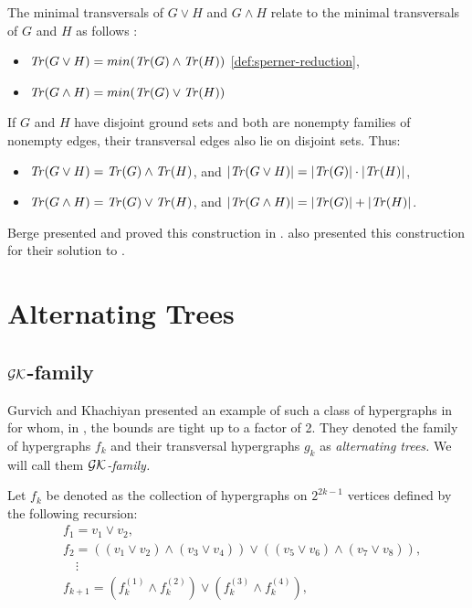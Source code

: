 The minimal transversals of $G\vee H$ and $G\wedge H$ relate to the minimal transversals of $G$ and $H$ as follows \cite{Ber87}:
\begin{itemize}
\item $\mathit{Tr}(G\vee H)=min(\mathit{Tr}(G)\wedge\mathit{Tr}(H))$ \ref{def:sperner-reduction},
\item $\mathit{Tr}(G\wedge H)=min(\mathit{Tr}(G)\vee\mathit{Tr}(H))$
\end{itemize}
If $G$ and $H$ have disjoint ground sets and both are nonempty families of nonempty edges, their transversal edges also lie on disjoint sets. Thus:
\begin{itemize}
\item $\mathit{Tr}(G\vee H)=\mathit{Tr}(G)\wedge\mathit{Tr}(H)$, and $|\mathit{Tr}(G\vee H)|=|\mathit{Tr}(G)|\cdot|\mathit{Tr}(H)|$,
\item $\mathit{Tr}(G\wedge H)=\mathit{Tr}(G)\vee\mathit{Tr}(H)$, and $|\mathit{Tr}(G\wedge H)|=|\mathit{Tr}(G)|+|\mathit{Tr}(H)|$.
\end{itemize}
\cite{Tak08}

Berge presented and proved this construction in \cite{Ber87}. \cite{KS03} also presented this construction for their solution to \FKA.

\section{Alternating Trees}\label{sec:alternating}

\subsection{\texorpdfstring{$\mathcal{GK}$}{GK}-family}

Gurvich and Khachiyan presented an example of such a class of hypergraphs in   for whom, in \FKA, the bounds are tight up to a factor of 2. They denoted the family of hypergraphs $f_k$ and their transversal hypergraphs $g_k$ as \emph{alternating trees.} We will call them \emph{$\mathcal{GK}$-family.}

Let $f_k$ be denoted as the collection of hypergraphs on $2^{2k-1}$ vertices defined by the following recursion:
\begin{align*}
&f_1=v_1\vee v_2,\\
&f_2=((v_1\vee v_2)\wedge(v_3\vee v_4))\vee((v_5\vee v_6)\wedge(v_7\vee v_8)),\\
&\quad\vdots\\
&f_{k+1}=(f_k^{(1)}\wedge f_k^{(2)})\vee(f_k^{(3)}\wedge f_k^{(4)}),
\end{align*}

